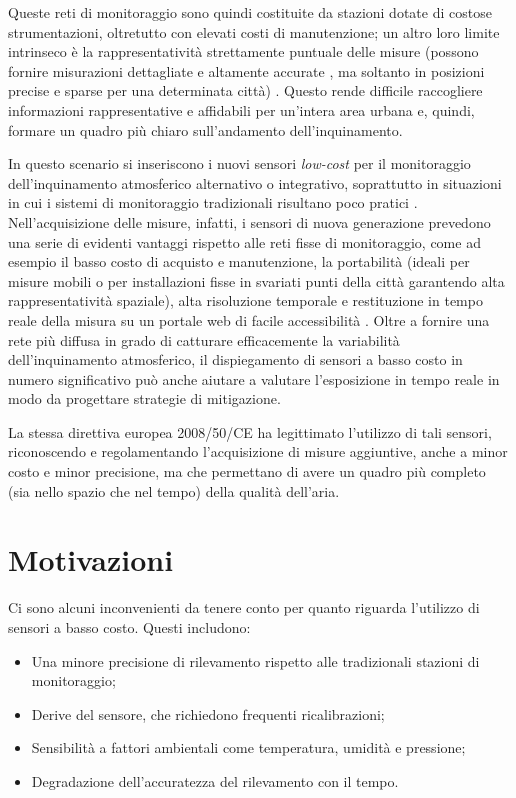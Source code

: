 Queste reti di monitoraggio sono quindi costituite da stazioni dotate di costose strumentazioni, oltretutto con elevati costi di manutenzione; un altro loro limite intrinseco è la rappresentatività strettamente puntuale delle misure (possono fornire misurazioni dettagliate e altamente accurate \cite{MEAD2013186}, ma soltanto in posizioni precise e sparse per una determinata città) \cite{s16050710}.
Questo rende difficile raccogliere informazioni rappresentative e affidabili per un'intera area urbana e, quindi, formare un quadro più chiaro sull'andamento dell'inquinamento. \cite{s16050710}

In questo scenario si inseriscono i nuovi sensori \textit{low-cost} per il monitoraggio dell’inquinamento atmosferico alternativo o integrativo, soprattutto in situazioni in cui i sistemi di monitoraggio tradizionali risultano poco pratici \cite{doi:10.1021/es4022602}. Nell’acquisizione delle misure, infatti, i sensori di nuova generazione prevedono una serie di evidenti vantaggi rispetto alle reti fisse di monitoraggio, come ad esempio il basso costo di acquisto e manutenzione, la portabilità (ideali per misure mobili o per installazioni fisse in svariati punti della città garantendo alta rappresentatività spaziale), alta risoluzione temporale e restituzione in tempo reale della misura su un portale web di facile accessibilità \cite{relazione_alice}.
Oltre a fornire una rete più diffusa in grado di catturare efficacemente la variabilità dell'inquinamento atmosferico, il dispiegamento di sensori a basso costo in numero significativo può anche aiutare a valutare l'esposizione in tempo reale in modo da progettare strategie di mitigazione. \cite{KUMAR2015199}

La stessa direttiva europea 2008/50/CE \cite{direttiva} ha legittimato l’utilizzo di tali sensori, riconoscendo e regolamentando l’acquisizione di misure aggiuntive, anche a minor costo e minor precisione, ma che permettano di avere un quadro più completo (sia nello spazio che nel tempo) della qualità dell’aria. \cite{relazione_alice}

\section{Motivazioni}\label{sec:motivazoni}
Ci sono alcuni inconvenienti da tenere conto per quanto riguarda l'utilizzo di sensori a basso costo. Questi includono: 
\begin{itemize}
  \item Una minore precisione di rilevamento rispetto alle tradizionali stazioni di monitoraggio; \cite{s17112478}
  \item Derive del sensore, che richiedono frequenti ricalibrazioni;
  \item Sensibilità a fattori ambientali come temperatura, umidità e pressione;
  \item Degradazione dell'accuratezza del rilevamento con il tempo. \cite{s18092843}
\end{itemize}

